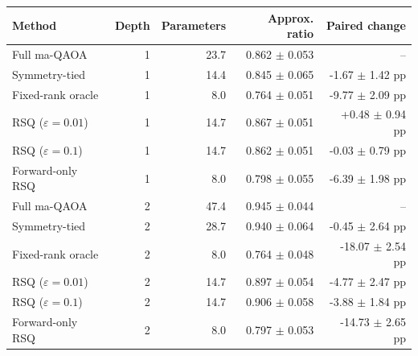 \begin{tabular}{lrrrr}
\toprule
Method & Depth & Parameters & Approx. ratio & Paired change \\
\midrule
Full ma-QAOA & 1 & 23.7 & 0.862 $\pm$ 0.053 & -- \\
Symmetry-tied & 1 & 14.4 & 0.845 $\pm$ 0.065 & -1.67 $\pm$ 1.42 pp \\
Fixed-rank oracle & 1 & 8.0 & 0.764 $\pm$ 0.051 & -9.77 $\pm$ 2.09 pp \\
RSQ ($\varepsilon=0.01$) & 1 & 14.7 & 0.867 $\pm$ 0.051 & +0.48 $\pm$ 0.94 pp \\
RSQ ($\varepsilon=0.1$) & 1 & 14.7 & 0.862 $\pm$ 0.051 & -0.03 $\pm$ 0.79 pp \\
Forward-only RSQ & 1 & 8.0 & 0.798 $\pm$ 0.055 & -6.39 $\pm$ 1.98 pp \\
\addlinespace
Full ma-QAOA & 2 & 47.4 & 0.945 $\pm$ 0.044 & -- \\
Symmetry-tied & 2 & 28.7 & 0.940 $\pm$ 0.064 & -0.45 $\pm$ 2.64 pp \\
Fixed-rank oracle & 2 & 8.0 & 0.764 $\pm$ 0.048 & -18.07 $\pm$ 2.54 pp \\
RSQ ($\varepsilon=0.01$) & 2 & 14.7 & 0.897 $\pm$ 0.054 & -4.77 $\pm$ 2.47 pp \\
RSQ ($\varepsilon=0.1$) & 2 & 14.7 & 0.906 $\pm$ 0.058 & -3.88 $\pm$ 1.84 pp \\
Forward-only RSQ & 2 & 8.0 & 0.797 $\pm$ 0.053 & -14.73 $\pm$ 2.65 pp \\
\bottomrule
\end{tabular}
